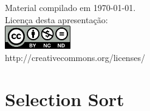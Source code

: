 \documentclass[portuguese,10pt,xcolor=table]{bredelebeamer}
\title{\insertlecture}
\author{Prof. Fernando Figueira\\(adaptado do material do Prof. Rafael Beserra Gomes)}
\institute{UFRN}
\date{}
\begin{document}
\begin{frame}
  \maketitle
 \begin{center}
 \tiny
Material compilado em \today.\\
  Licença desta apresentação:\\
		\includegraphics[height=1.0cm]{by-nc-nd.png}\\
http://creativecommons.org/licenses/
	\end{center}
\end{frame}


\def\WN[#1]{\cellcolor{white!40}#1}
\def\VN[#1]{\cellcolor{blue!40}#1}
\def\UN[#1]{\cellcolor{green!40}#1}
\def\ZN[#1]{\cellcolor{deepgreen!90}#1}
\def\RN[#1]{\cellcolor{red!40}#1}
\def\DRN[#1]{\cellcolor{deepred!90}#1}


\section{Selection Sort}

	\begin{frame}[c]
		\begin{center}
			\structure{\large \insertsection}
		\end{center}
	\end{frame} 
	
	\begin{frame}
		
	\end{frame}
	\begin{frame}
		
		

	\end{frame}
\end{document}
